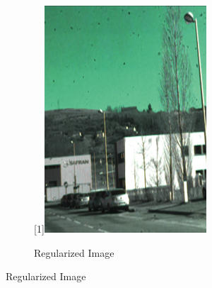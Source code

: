 \begin{figure}[h]
\begin{subfigure}[b]{0.32\linewidth}
		\scalebox{-1}[1]{\includegraphics[width=\linewidth]{Figures/Aug/hsl_flip.png}}
	\end{subfigure}
	\begin{subfigure}[b]{0.32\linewidth}
		\centering
		\caption*{Regularized Image}
		

\end{subfigure}
\end{figure}
